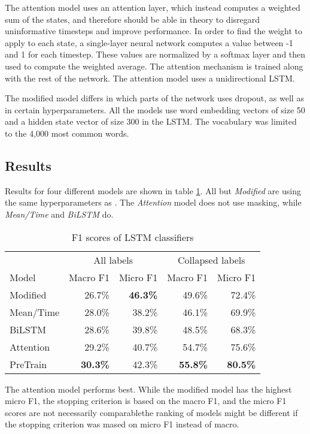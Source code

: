 The attention model uses an attention layer, which instead computes a
weighted sum of the states, and therefore should be able in theory to
disregard uninformative timesteps and improve performance. In order to find
the weight to apply to each state, a single-layer neural network computes a
value between -1 and 1 for each timestep. These values are normalized by a
softmax layer and then used to compute the weighted average. The attention
mechanism is trained along with the rest of the network. The attention model
uses a unidirectional \ac{LSTM}.

The modified model differs in which parts of the network uses dropout, as
well as in certain hyperparameters. All the models use word embedding vectors
of size 50 and a hidden state vector of size 300 in the \ac{LSTM}. The
vocabulary was limited to the 4,000 most common words.

\subsection{Results}

Results for four different models are shown in table \ref{lstm-results}. All
but \emph{Modified} are using the same hyperparameters as
\citeauthor{taghipour16}. The \emph{Attention} model does not use masking,
while \emph{Mean/Time} and \emph{BiLSTM} do.

\begin{table}
  \centering
  \begin{tabular}{|l|rr|rr|}
    \toprule
            & \multicolumn{2}{c|}{All labels} & \multicolumn{2}{c|}{Collapsed labels} \\
    Model     & Macro F1        & Micro F1        & Macro F1        & Micro F1        \\
    \midrule
    Modified  &         26.7\%  & \textbf{46.3\%} &         49.6\%  &         72.4\%  \\
    Mean/Time &         28.0\%  &         38.2\%  &         46.1\%  &         69.9\%  \\
    BiLSTM    &         28.6\%  &         39.8\%  &         48.5\%  &         68.3\%  \\
    Attention &         29.2\%  &         40.7\%  &         54.7\%  &         75.6\%  \\
    PreTrain  & \textbf{30.3\%} &         42.3\%  & \textbf{55.8\%} & \textbf{80.5\%} \\
    \bottomrule
  \end{tabular}
  \caption{F1 scores of LSTM classifiers}
  \label{lstm-results}
\end{table}

The attention model performs best. While the modified model has the highest
micro F1, the stopping criterion is based on the macro F1, and the micro
F1 scores are not necessarily comparable\textemdash the ranking of models might be
different if the stopping criterion was mased on micro F1 instead of macro.
